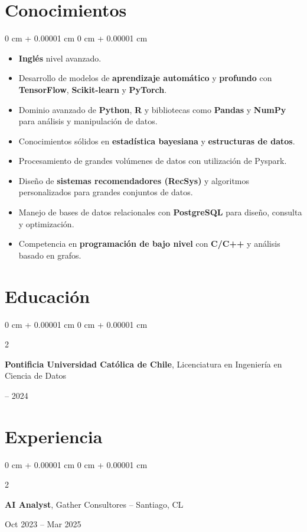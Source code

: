 \documentclass[10pt, letterpaper]{article}
\newenvironment{highlightsforbulletentries}{
    \begin{itemize}[
        topsep=0.10 cm,
        parsep=0.10 cm,
        partopsep=0pt,
        itemsep=0pt,
        leftmargin=10pt
    ]
}{
    \end{itemize}
} %
\newenvironment{onecolentry}{
    \begin{adjustwidth}{
        0 cm + 0.00001 cm
    }{
        0 cm + 0.00001 cm
    }
}{
    \end{adjustwidth}
} %
\newenvironment{twocolentry}[2][]{
    \onecolentry
    \def\secondColumn{#2}
    \setcolumnwidth{\fill, 4.5 cm}
    \begin{paracol}{2}
}{
    \switchcolumn \raggedleft \secondColumn
    \end{paracol}
    \endonecolentry
} %
\begin{document}
\section{Conocimientos}

\begin{onecolentry}
    \begin{highlightsforbulletentries}

\begin{itemize}
    \item \textbf{Inglés} nivel avanzado.
    \item Desarrollo de modelos de \textbf{aprendizaje automático} y \textbf{profundo} con \textbf{TensorFlow}, \textbf{Scikit-learn} y \textbf{PyTorch}.
    \item Dominio avanzado de \textbf{Python}, \textbf{R} y bibliotecas como \textbf{Pandas} y \textbf{NumPy} para análisis y manipulación de datos.
    \item Conocimientos sólidos en \textbf{estadística bayesiana} y \textbf{estructuras de datos}.
    \item Procesamiento de grandes volúmenes de datos con utilización de Pyspark.
    \item Diseño de \textbf{sistemas recomendadores (RecSys)} y algoritmos personalizados para grandes conjuntos de datos.
    \item Manejo de bases de datos relacionales con \textbf{PostgreSQL} para diseño, consulta y optimización.
    \item Competencia en \textbf{programación de bajo nivel} con \textbf{C/C++} y análisis basado en grafos.
\end{itemize}
\end{highlightsforbulletentries}
\end{onecolentry}

\section{Educación}

\begin{twocolentry}{
    2021 – 2024
}
    \textbf{Pontificia Universidad Católica de Chile}, Licenciatura en Ingeniería en Ciencia de Datos
\end{twocolentry}

\section{Experiencia}

\begin{twocolentry}{Oct 2023 – Mar 2025}
    \textbf{AI Analyst}, Gather Consultores -- Santiago, CL
\end{twocolentry}
\end{document}
